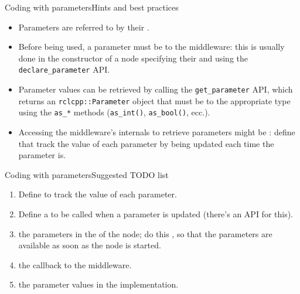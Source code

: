 \begin{frame}{Coding with parameters}{Hints and best practices}
	\begin{itemize}
		\item Parameters are referred to by their .
		\item Before being used, a parameter must be  to the middleware: this is usually done in the constructor of a node specifying their  and  using the \texttt{declare\_parameter} API.
		\item Parameter values can be retrieved  by calling the \texttt{get\_parameter} API, which returns an \texttt{rclcpp::Parameter} object that must be  to the appropriate type using the \texttt{as\_*} methods (\texttt{as\_int()}, \texttt{as\_bool()}, ecc.).
    \item Accessing the middleware's internals to retrieve parameters might be : define  that track the value of each parameter by being updated each time the parameter is.
	\end{itemize}
\end{frame}
\begin{frame}{Coding with parameters}{Suggested TODO list}
  \begin{enumerate}
    \item Define  to track the value of each parameter.
    \item Define a  to be called when a parameter is updated (there's an API for this).
    \item {} the parameters in the  of the node; do this , so that the parameters are available as soon as the node is started.
    \item {} the callback to the middleware.
    \item {} the parameter values in the implementation.
  \end{enumerate}
\end{frame}
